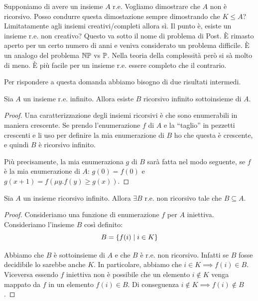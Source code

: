 Supponiamo di avere un insieme $A$ r.e. Vogliamo dimostrare che $A$ non è ricorsivo. Posso condurre
questa dimostazione sempre dimostrando che $K \leq A$? Limitatamente agli insiemi creativi/completi
allora sì. Il punto è, esiste un insieme r.e. non creativo? Questo va sotto il nome di problema di
Post. È rimasto aperto per un certo numero di anni e veniva considerato un problema difficile.  È
un analogo del problema $\mathbb{NP}$ vs $\mathbb{P}$. Nella teoria della complessità però si sà molto di meno. È più
facile per un insieme r.e. essere completo che il contrario.

Per rispondere a questa domanda abbiamo bisogno di due risultati intermedi.

\begin{thm}
    Sia $A$ un insieme r.e. infinito. Allora esiste $B$ ricorsivo infinito sottoinsieme di $A$.
\end{thm}
\begin{proof}
    Una caratterizzazione degli insiemi ricorsivi è che sono enumerabili in maniera crescente. Se
    prendo l'enumerazione $f$ di $A$ e la ``taglio'' in pezzetti crescenti e li uso per definire la
    mia enumerazione di $B$ ho che questa è crescente, e quindi $B$ è ricorsivo infinito. 

    Più precisamente, la mia enumeraziona $g$ di $B$ sarà fatta nel modo seguente, se $f$ è la mia
    enumerazione di $A$: $g(0) = f(0)$ e $g(x+1) = f(\mu y. f(y) \geq g(x))$.
\end{proof}

\begin{thm}
    Sia $A$ un insieme ricorsivo infinito. Allora $\exists B$ r.e. non ricorsivo tale che $B \subseteq
    A$.
\end{thm}
\begin{proof}
    Consideriamo una funzione di enumerazione $f$ per $A$ iniettiva. Consideriamo l'insieme $B$ così
    definito:
    \begin{equation*}
        B = \{f(i) \mid i \in K\}
    \end{equation*}

    Abbiamo che $B$ è sottoinsieme di $A$ e che $B$ è r.e. non ricorsivo. Infatti se $B$ fosse
    decidibile lo sarebbe anche $K$. In particolare, abbiamo che $i \in K \implies f(i) \in B$.
    Viceversa essendo $f$ iniettiva non è possibile che un elemento $i \notin K$ venga mappato da
    $f$ in un elemento $f(i) \in B$. Di conseguenza $i \notin K \implies f(i) \notin B$.
\end{proof}

